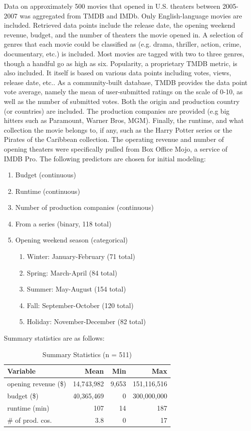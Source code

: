 \documentclass[10pt]{article}
\begin{document}
Data on approximately 500 movies that opened in U.S. theaters between 2005-2007 was aggregated from TMDB and IMDb. Only English-language movies are included. Retrieved data points include the release date, the opening weekend revenue, budget, and the number of theaters the movie opened in. A selection of genres that each movie could be classified as (e.g. drama, thriller, action, crime, documentary, etc.) is included. Most movies are tagged with two to three genres, though a handful go as high as six. Popularity, a proprietary TMDB metric, is also included. It itself is based on various data points including votes, views, release date, etc.. As a community-built database, TMDB provides the data point vote average, namely the mean of user-submitted ratings on the scale of 0-10, as well as the number of submitted votes.  Both the origin and production country (or countries) are included. The production companies are provided (e.g big hitters such as Paramount, Warner Bros, MGM). Finally, the runtime, and what collection the movie belongs to, if any, such as the Harry Potter series or the Pirates of the Caribbean collection. The operating revenue and number of opening theaters were specifically pulled from Box Office Mojo, a service of IMDB Pro. The following predictors are chosen for initial modeling:
\begin{enumerate}
\item Budget (continuous)
\item Runtime (continuous)
\item Number of production companies (continuous)
\item From a series (binary, 118 total)
\item Opening weekend season (categorical)
\begin{enumerate}
\item Winter: January-February (71 total)
\item Spring: March-April (84 total)
\item Summer: May-August (154 total)
\item Fall: September-October (120 total)
\item Holiday: November-December (82 total)
\end{enumerate}
\end{enumerate}

Summary statistics are as follows:
\begin{table}[H]
\centering
\caption{Summary Statistics (n = 511)}
\begin{tabular}{|lrrr|} 
\hline
Variable & Mean & Min & Max \\ 
\hline
opening revenue (\$) & 14,743,982 & 9,653 & 151,116,516\\
\hline
budget (\$) & 40,365,469 & 0 & 300,000,000\\
\hline
runtime (min) & 107 & 14 & 187\\
\hline
\# of prod. cos. & 3.8 & 0 & 17\\
\hline
\end{tabular}  
\end{table}
\end{document}
